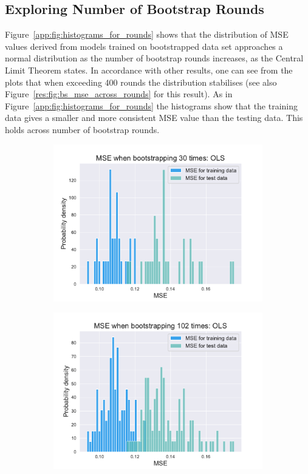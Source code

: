 \documentclass[twocolumn,english,notitlepage]{article}
\begin{document}
\begin{appendices}
    
    \section{Exploring Number of Bootstrap Rounds} \label{app:sec:BS rounds}
         Figure~\ref{app:fig:histograms_for_rounds} shows that the distribution of MSE values derived from models trained on bootstrapped data set approaches a normal distribution as the number of bootstrap rounds increases, as the Central Limit Theorem states. In accordance with other results, one can see from the plots that when exceeding 400 rounds the distribution stabilises (see also Figure~\ref{res:fig:bs_mse_across_rounds} for this result). As in Figure~\ref{app:fig:histograms_for_rounds} the histograms show that the training data gives a smaller and more consistent MSE value than the testing data. This holds across number of bootstrap rounds.
        \begin{figure}
            \begin{subfigure}{.5\textwidth}
                \centering
                \includegraphics[width=.9\linewidth]{BS_hist_bootstraped_30_rounds_of_degree_7.pdf}
                \caption{}
                \label{app:fig:histograms_for_rounds:30}
                \end{subfigure}
            \hfill
            \begin{subfigure}{.5\textwidth}
                \centering
                \includegraphics[width=.9\linewidth]{BS_hist_bootstraped_102_rounds_of_degree_7.pdf}

\end{subfigure}
\end{figure}
\end{appendices}
\end{document}
